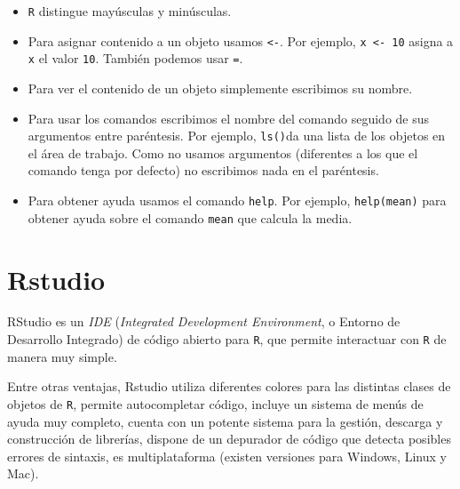\documentclass[]{book}
\begin{document}
\begin{itemize}
\item
  \texttt{R} distingue mayúsculas y minúsculas.
\item
  Para asignar contenido a un objeto usamos \texttt{\textless{}-}. Por
  ejemplo, \texttt{x\ \textless{}-\ 10} asigna a \texttt{x} el valor
  \texttt{10}. También podemos usar \texttt{=}.
\item
  Para ver el contenido de un objeto simplemente escribimos su nombre.
\item
  Para usar los comandos escribimos el nombre del comando seguido de sus
  argumentos entre paréntesis. Por ejemplo, \texttt{ls()}da una lista de
  los objetos en el área de trabajo. Como no usamos argumentos
  (diferentes a los que el comando tenga por defecto) no escribimos nada
  en el paréntesis.
\item
  Para obtener ayuda usamos el comando \texttt{help}. Por ejemplo,
  \texttt{help(mean)} para obtener ayuda sobre el comando \texttt{mean}
  que calcula la media.
\end{itemize}

\section{Rstudio}\label{rstudio}

RStudio es un \emph{IDE} (\emph{Integrated Development Environment}, o
Entorno de Desarrollo Integrado) de código abierto para \texttt{R}, que
permite interactuar con \texttt{R} de manera muy simple.

Entre otras ventajas, Rstudio utiliza diferentes colores para las
distintas clases de objetos de \texttt{R}, permite autocompletar código,
incluye un sistema de menús de ayuda muy completo, cuenta con un potente
sistema para la gestión, descarga y construcción de librerías, dispone
de un depurador de código que detecta posibles errores de sintaxis, es
multiplataforma (existen versiones para Windows, Linux y Mac).
\end{document}
